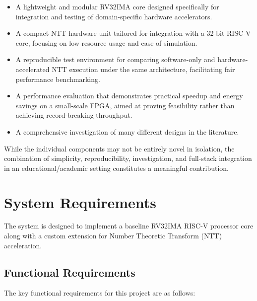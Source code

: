 \documentclass[a4paper, 12pt, titlepage]{article}
\begin{document}
\begin{itemize}
  \item A lightweight and modular RV32IMA core designed specifically for integration and testing of domain-specific hardware accelerators.
  \item A compact NTT hardware unit tailored for integration with a 32-bit RISC-V core, focusing on low resource usage and ease of simulation.
  \item A reproducible test environment for comparing software-only and hardware-accelerated NTT execution under the same architecture, facilitating fair performance benchmarking.
  \item A performance evaluation that demonstrates practical speedup and energy savings on a small-scale FPGA, aimed at proving feasibility rather than achieving record-breaking throughput.
  \item A comprehensive investigation of many different designs in the literature.
\end{itemize}

While the individual components may not be entirely novel in isolation, the combination of simplicity, reproducibility, investigation, and full-stack integration in an educational/academic setting constitutes a meaningful contribution.

\newpage

\section{System Requirements} \label{sec:sysreq}

The system is designed to implement a baseline RV32IMA RISC-V processor core along with a custom extension for Number Theoretic Transform (NTT) acceleration.

\subsection{Functional Requirements}

The key functional requirements for this project are as follows:
\end{document}
